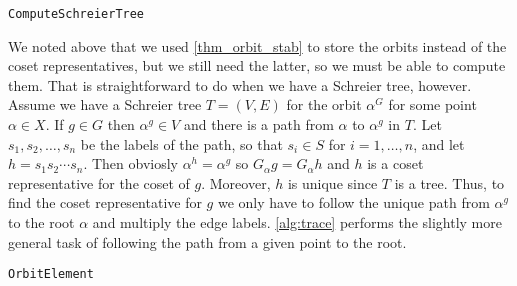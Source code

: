 \begin{algorithm} 
\dontprintsemicolon
\caption{\texttt{ComputeSchreierTree}}
\label{alg:orbit}
\end{algorithm}
We noted above that we used \ref{thm_orbit_stab} to store the orbits
instead of the coset representatives, but we still need the latter, so
we must be able to compute them. That is straightforward to do when we
have a Schreier tree, however.  Assume we have a Schreier tree $T =
(V, E)$ for the orbit $\alpha^G$ for some point $\alpha \in X$. If $g
\in G$ then $\alpha^g \in V$ and there is a path from $\alpha$ to
$\alpha^g$ in $T$. Let $s_1, s_2, \dotsc, s_n$ be the labels of the
path, so that $s_i \in S$ for $i = 1, \dotsc, n$, and let $h = s_1 s_2
\dotsm s_n$. Then obviosly $\alpha^h = \alpha^g$ so $G_{\alpha} g = 
G_{\alpha} h$ and $h$ is a coset representative for the coset of $g$.
Moreover, $h$ is unique since $T$ is a tree. Thus, to find the coset
representative for $g$ we only have to follow the unique path from
$\alpha^g$ to the root $\alpha$ and multiply the edge labels. \ref{alg:trace} performs the slightly more general task of
following the path from a given point to the root.

\begin{algorithm} 
\dontprintsemicolon
\caption{\texttt{OrbitElement}}
\label{alg:trace}
\end{algorithm}

